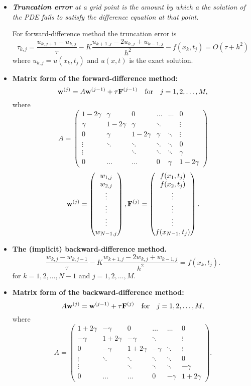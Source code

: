 \documentclass[12pt]{article}
\begin{document}
\begin{itemize}
\item
\textit{\textbf{Truncation error} at a grid point is the amount by which a the solution of the PDE fails to satisfy the difference equation at that point. }

\vskip 2mm
For forward-difference method the truncation error is
\[
\tau_{k,j}=\frac{u_{k,j+1}-u_{k,j}}{\tau}-K
\frac{u_{k+1, j}-2u_{k,j}+u_{k-1,j}}{h^{2}}-f(x_k,t_j)=O(\tau+h^2)
\]
where $u_{k,j}=u(x_{k},t_{j})$ and $u(x,t)$ is the exact solution.

\item \textbf{Matrix form of the forward-difference method:}
\[
{\bf w}^{(j)}=A{\bf w}^{(j-1)}+\tau {\bf F}^{(j-1)} \quad \hbox{for} \quad j=1,2,\dots,M,
\]
where
\[
A=\begin{pmatrix}
1-2\gamma &\gamma &0      &\dots  &\dots &0 \\
\gamma &1-2\gamma &\gamma &\ddots  &     &\vdots \\
0      &\gamma &1-2\gamma &\gamma &\ddots &\vdots \\
\vdots &\ddots &\ddots &\ddots &\ddots &0 \\
\vdots &       &\ddots &\ddots &\ddots &\gamma \\
0      &\dots  &\dots  &0      &\gamma &1-2\gamma
\end{pmatrix}
\]
\[
{\bf w}^{(j)}=\begin{pmatrix}
w_{1,j} \\
w_{2,j} \\
\vdots \\
\vdots \\
\vdots \\
w_{N-1,j}
\end{pmatrix},
{\bf F}^{(j)}=\begin{pmatrix}
f(x_1,t_j)\\
f(x_2,t_j) \\
\vdots \\
\vdots \\
\vdots \\
f(x_{N-1},t_j)
\end{pmatrix}.
\]

\item \textbf{The (implicit) backward-difference method.}
\[
\frac{w_{k,j}-w_{k,j-1}}{\tau}-K
\frac{w_{k+1, j}-2w_{k,j}+w_{k-1,j}}{h^{2}}=f(x_k,t_j).
\]
for $k=1, 2, \dots, N-1$ and $j=1, 2, \dots, M$.

\item \textbf{Matrix form of the backward-difference method:}
\[
A{\bf w}^{(j)}={\bf w}^{(j-1)}+\tau {\bf F}^{(j)} \quad \hbox{for} \quad j=1,2,\dots,M,
\]
where
\[
A=\begin{pmatrix}
1+2\gamma &-\gamma &0      &\dots  &\dots &0 \\
-\gamma &1+2\gamma &-\gamma &\ddots  &     &\vdots \\
0      &-\gamma &1+2\gamma &-\gamma &\ddots &\vdots \\
\vdots &\ddots &\ddots &\ddots &\ddots &0 \\
\vdots &       &\ddots &\ddots &\ddots &-\gamma \\
0      &\dots  &\dots  &0      &-\gamma &1+2\gamma
\end{pmatrix}.
\]


\end{itemize}
\end{document}
